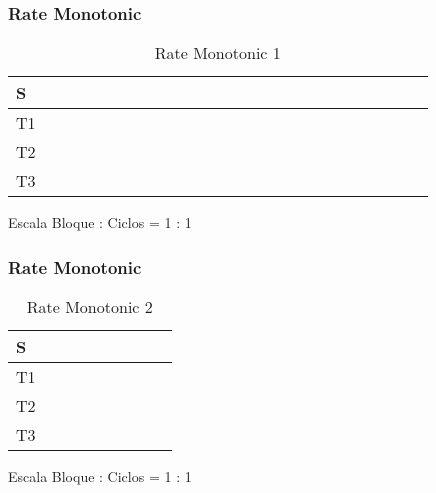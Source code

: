 \documentclass[xcolor=table]{beamer}
\begin{document}
\begin{frame} 
\frametitle{ Rate Monotonic } 
\begin{table} 
\centering 
\begin{tabular}{|l|l|l|l|l|l|l|l|l|l|l|l|l|l|l|l|l|l|l|l|l|l|l|l|l|} 
\hline 
S & \cellcolor{green} & \cellcolor{green} & \cellcolor{green} & \cellcolor{green} & \cellcolor{green} & \cellcolor{green} & \cellcolor{green} & \cellcolor{green} & \cellcolor{green} & \cellcolor{green} & \cellcolor{green} & \cellcolor{green} & \cellcolor{green} & \cellcolor{green} & \cellcolor{green} & \cellcolor{green} & \cellcolor{green} & \cellcolor{green} & \cellcolor{green} & \cellcolor{green} & \cellcolor{green} & \cellcolor{green} & \cellcolor{green} & \cellcolor{green} \\ \hline 
T1 & \cellcolor{blue} & \cellcolor{blue} & \cellcolor{blue} & \cellcolor{blue} & \cellcolor{blue} & \cellcolor{blue} & \cellcolor{blue} & \cellcolor{blue} & \cellcolor{blue} & \cellcolor{blue} & & & & & & & & & & & & & & \\ \hline 
T2 & & & & & & & & & & & \cellcolor{red} & \cellcolor{red} & \cellcolor{red} & \cellcolor{red} & \cellcolor{red} & \cellcolor{red} & \cellcolor{red} & \cellcolor{red} & \cellcolor{red} & \cellcolor{red} & \cellcolor{red} & \cellcolor{red} & \cellcolor{red} & \cellcolor{red} \\ \hline 
T3 & & & & & & & & & & & & & & & & & & & & & & & & \\ \hline 
\end{tabular} 
\caption{ Rate Monotonic 1 } 
\end{table} 
Escala Bloque : Ciclos = 1 : 1 
\end{frame} 
\begin{frame} 
\frametitle{ Rate Monotonic } 
\begin{table} 
\centering 
\begin{tabular}{|l|l|l|l|l|l|l|l|l|} 
\hline 
S & \cellcolor{green} & \cellcolor{green} & \cellcolor{green} & \cellcolor{green} & \cellcolor{green} & \cellcolor{green} & \cellcolor{green} & \cellcolor{green} \\ \hline 
T1 & & & & & & & & \\ \hline 
T2 & \cellcolor{red} & \cellcolor{red} & \cellcolor{red} & \cellcolor{red} & \cellcolor{red} & \cellcolor{red} & & \\ \hline 
T3 & & & & & & & \cellcolor{green} & \cellcolor{green} \\ \hline 
\end{tabular} 
\caption{ Rate Monotonic 2 } 
\end{table} 
Escala Bloque : Ciclos = 1 : 1 
\end{frame} 
\end{document}
